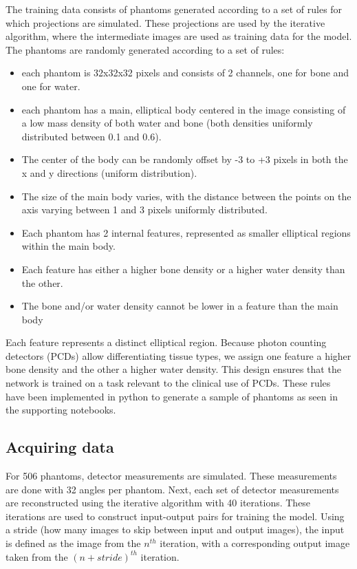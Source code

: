 \documentclass{article}
\begin{document}
The training data consists of phantoms generated according to a set of rules for which projections are simulated. These projections are used by the iterative algorithm, where the intermediate images are used as training data for the model. The phantoms are randomly generated according to a set of rules:

\begin{itemize}
\item each phantom is 32x32x32 pixels and consists of 2 channels, one for bone and one for water.
\item each phantom has a main, elliptical body centered in the image consisting of a low mass density of both water and bone (both densities uniformly distributed between 0.1 and 0.6).
\item The center of the body can be randomly offset by -3 to +3 pixels in both the x and y directions (uniform distribution).
\item The size of the main body varies, with the distance between the points on the axis varying between 1 and 3 pixels uniformly distributed.
\item Each phantom has 2 internal features, represented as smaller elliptical regions within the main body.
\item Each feature has either a higher bone density or a higher water density than the other.
\item The bone and/or water density cannot be lower in a feature than the main body
\end{itemize}

Each feature represents a distinct elliptical region. Because photon counting detectors (PCDs) allow differentiating tissue types, we assign one feature a higher bone density and the other a higher water density. This design ensures that the network is trained on a task relevant to the clinical use of PCDs. These rules have been implemented in python to generate a sample of phantoms as seen in the supporting notebooks.

\subsection{Acquiring data}

For 506 phantoms, detector measurements are simulated. These measurements are done with 32 angles per phantom. Next, each set of detector measurements are reconstructed using the iterative algorithm with 40 iterations. These iterations are used to construct input-output pairs for training the model. Using a stride (how many images to skip between input and output images), the input is defined as the image from the $n^{th}$ iteration, with a corresponding output image taken from the $(n+stride)^{th}$ iteration.
\end{document}
